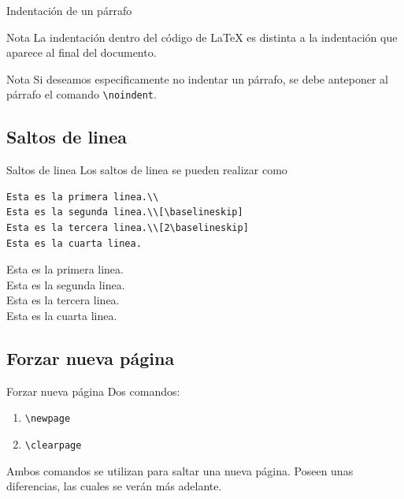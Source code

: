 \documentclass[../slides.tex]{subfiles}
\begin{document}
    \begin{frame}{Indentación de un párrafo}
        \begin{alertblock}{Nota}
        La indentación dentro del código de \LaTeX{} es distinta a la indentación que aparece al final del documento.
        \end{alertblock}
        
        \begin{block}{Nota}
        Si deseamos especificamente no indentar un párrafo, se debe anteponer al párrafo el comando \texttt{\textbackslash noindent}.
        \end{block}
    \end{frame}

    \subsection{Saltos de linea}

    \begin{frame}[fragile]{Saltos de linea}
        Los saltos de linea se pueden realizar como
            \begin{verbatim}
Esta es la primera linea.\\
Esta es la segunda linea.\\[\baselineskip]
Esta es la tercera linea.\\[2\baselineskip]
Esta es la cuarta linea.
            \end{verbatim}
Esta es la primera linea.\\
Esta es la segunda linea.\\[\baselineskip]
Esta es la tercera linea.\\[2\baselineskip]
Esta es la cuarta linea.
    \end{frame}

    \subsection{Forzar nueva página}
    \begin{frame}{Forzar nueva página}
        Dos comandos:
            \begin{enumerate}
                \item \texttt{\textbackslash newpage}
                \item \texttt{\textbackslash clearpage}
            \end{enumerate}
        Ambos comandos se utilizan para saltar una nueva página. Poseen unas diferencias, las cuales se verán más adelante.
    \end{frame}
    
\end{document}

